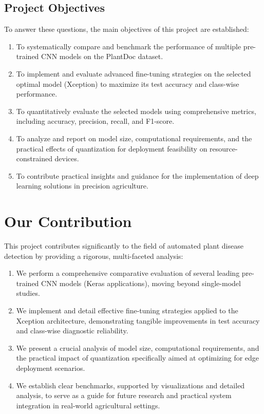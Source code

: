 \documentclass[12pt, a4paper]{report}
\begin{document}
\subsection*{Project Objectives}
\noindent %
To answer these questions, the main objectives of this project are established:
\begin{enumerate}
    \item To systematically compare and benchmark the performance of multiple pre-trained CNN models on the PlantDoc dataset.
    \item To implement and evaluate advanced fine-tuning strategies on the selected optimal model (Xception) to maximize its test accuracy and class-wise performance.
    \item To quantitatively evaluate the selected models using comprehensive metrics, including accuracy, precision, recall, and F1-score.
    \item To analyze and report on model size, computational requirements, and the practical effects of quantization for deployment feasibility on resource-constrained devices.
    \item To contribute practical insights and guidance for the implementation of deep learning solutions in precision agriculture.
\end{enumerate}

\section{Our Contribution}
\label{sec:contribution}
This project contributes significantly to the field of automated plant disease detection by providing a rigorous, multi-faceted analysis:
\begin{enumerate}
    \item We perform a comprehensive comparative evaluation of several leading pre-trained CNN models (Keras applications), moving beyond single-model studies.
    \item We implement and detail effective fine-tuning strategies applied to the Xception architecture, demonstrating tangible improvements in test accuracy and class-wise diagnostic reliability.
    \item We present a crucial analysis of model size, computational requirements, and the practical impact of quantization specifically aimed at optimizing for edge deployment scenarios.
    \item We establish clear benchmarks, supported by visualizations and detailed analysis, to serve as a guide for future research and practical system integration in real-world agricultural settings.
\end{enumerate}
\end{document}
